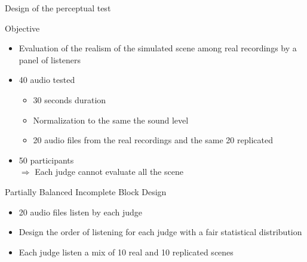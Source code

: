 \documentclass{beamer}
\begin{document}
\begin{frame}{Design of the perceptual test}

\begin{block}{Objective}
\begin{itemize}
	\item Evaluation of the realism of the simulated scene among real recordings by a panel of listeners
\end{itemize}
\end{block}

\begin{itemize}
	\item 40 audio tested
	\begin{itemize}
		\item 30 seconds duration
		\item Normalization to the same the sound level
		\item 20 audio files from the real recordings and the same 20 replicated
	\end{itemize}
	
	\item 50 participants \\	
	$\Rightarrow$ Each judge cannot evaluate all the scene
\end{itemize}

\begin{block}{Partially Balanced Incomplete Block Design}
\begin{itemize}
	\item 20 audio files listen by each judge 
	\item Design the order of listening for each judge with a fair statistical distribution
	\item Each judge listen a mix of 10 real and 10 replicated scenes
\end{itemize}

\end{block}

\end{frame}

\end{document}
